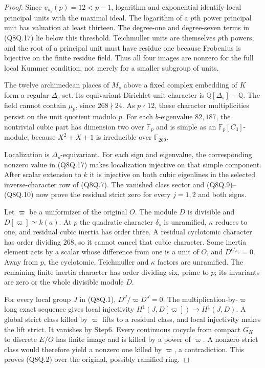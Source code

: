 \begin{proof}
Since $v_{u_s}(p)=12<p-1$, logarithm and exponential identify
local principal units with the maximal ideal.
The logarithm of a $p$th power principal unit has valuation at
least thirteen.  The degree-one and degree-seven terms in
(Q8Q.17) lie below this threshold.
Teichmuller units are themselves $p$th powers, and the root of
a principal unit must have residue one because Frobenius is
bijective on the finite residue field.
Thus all four images are nonzero for the full local Kummer
condition, not merely for a smaller subgroup of units.

The twelve archimedean places of $M_s$ above a fixed complex
embedding of $K$ form a regular $\Delta_s$-set.
Its equivariant Dirichlet unit character is
$\mathbb Q[\Delta_s]-\mathbb Q$.
The field cannot contain $\mu_p$, since $268\nmid24$.
As $p\nmid12$, these character multiplicities persist on the
unit quotient modulo $p$.
For each $b$-eigenvalue $82,187$, the nontrivial cubic part has
dimension two over $\mathbb F_p$ and is simple as an
$\mathbb F_p[C_3]$-module, because $X^2+X+1$ is irreducible
over $\mathbb F_{269}$.

Localization is $\Delta_s$-equivariant.
For each sign and eigenvalue, the corresponding nonzero value
in (Q8Q.17) makes localization injective on that simple component.
After scalar extension to $k$ it is injective on both cubic
eigenlines in the selected inverse-character row of (Q8Q.7).
The vanished class sector and (Q8Q.9)--(Q8Q.10) now prove
the residual strict zero for every $j=1,2$ and both signs.

Let $\varpi$ be a uniformizer of the original $O$.
The module $D$ is divisible and $D[\varpi]\simeq k(a)$.
At $p$ the quadratic character $\delta_s$ is unramified,
$\kappa$ reduces to one, and residual cubic inertia has order
three.  A residual cyclotomic character has order dividing $268$,
so it cannot cancel that cubic character.
Some inertia element acts by a scalar whose difference from
one is a unit of $O$, and $D^{G_{K_p}}=0$.
Away from $p$, the cyclotomic, Teichmuller and $\kappa$ factors
are unramified.  The remaining finite inertia character has
order dividing six, prime to $p$; its invariants are zero or
the whole divisible module $D$.

For every local group $J$ in (Q8Q.1),
$D^J/\varpi D^J=0$.
The multiplication-by-$\varpi$ long exact sequence gives local
injectivity $H^1(J,D[\varpi])\to H^1(J,D)$.
A global strict class killed by $\varpi$ lifts to a residual
class, and local injectivity makes the lift strict.
It vanishes by Step6.
Every continuous cocycle from compact $G_K$ to discrete $E/O$
has finite image and is killed by a power of $\varpi$.
A nonzero strict class would therefore yield a nonzero one
killed by $\varpi$, a contradiction.
This proves (Q8Q.2) over the original, possibly ramified ring.
\end{proof}

